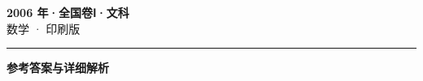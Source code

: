 \documentclass[zihao=5, a4paper]{ctexart}
\begin{document}
\begin{center}
  {\Large\bfseries 2006 年·全国卷Ⅰ·文科}\\[4pt]
  {\large 数学 · 印刷版}
\end{center}
\medskip
{}

\par\bigskip\hrule\bigskip
{}
\begin{center}{\large\bfseries 参考答案与详细解析}\end{center}
\smallskip

\end{document}
